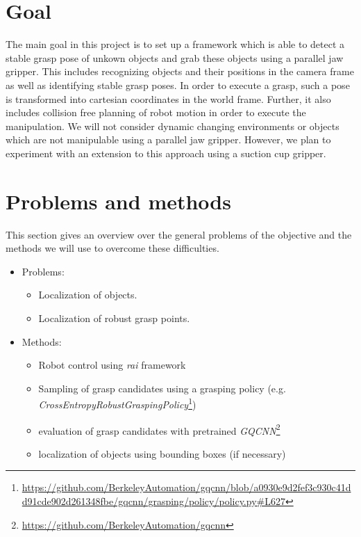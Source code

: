 \documentclass[a4paper]{article}
\begin{document}
\section{Goal} 
\label{2sec_goal}

The main goal in this project is to set up a framework which is able to detect a stable grasp pose of unkown objects and grab these objects using a parallel jaw gripper.
This includes recognizing objects and their positions in the camera frame as well as identifying stable grasp poses.
In order to execute a grasp, such a pose is transformed into cartesian coordinates in the world frame.
Further, it also includes collision free planning of robot motion in order to execute the manipulation.
We will not consider dynamic changing environments or objects which are not manipulable using a parallel jaw gripper. 
However, we plan to experiment with an extension to this approach using a suction cup gripper.

\section{Problems and methods}
\label{3sec_prob_n_meth}
This section gives an overview over the general problems of the objective and the methods we will use to overcome these difficulties.


\begin{itemize}
    \item Problems:\\
    \begin{itemize}
        \item Localization of objects.
        \item Localization of robust grasp points.
    \end{itemize}
    \item Methods:\\
    \begin{itemize}
        \item Robot control using \textit{rai} framework
        \item Sampling of grasp candidates using a grasping policy (e.g. \textit{CrossEntropyRobustGraspingPolicy}\footnote{\url{https://github.com/BerkeleyAutomation/gqcnn/blob/a0930e9d2fef3c930c41dd91cde902d261348fbe/gqcnn/grasping/policy/policy.py#L627}}) 
        \item evaluation of grasp candidates with pretrained \textit{GQCNN}\footnote{\url{https://github.com/BerkeleyAutomation/gqcnn}}
        \item localization of objects using bounding boxes (if necessary)
    \end{itemize}
\end{itemize}
\end{document}
